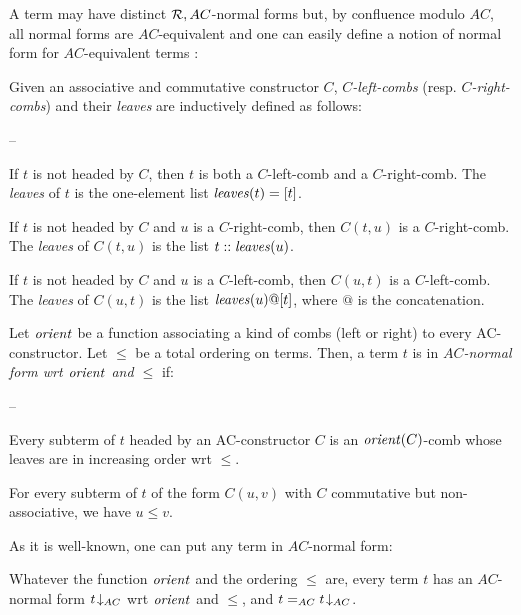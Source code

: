A term may have distinct $\mathcal{R},AC$-normal forms but, by confluence
modulo $AC$, all normal forms are $AC$-equivalent and one can easily
define a notion of normal form for $AC$-equivalent terms
\cite{hullot80thesis}:

\begin{dfn}
Given an associative and commutative constructor $C$, {\em
$C$-left-combs} (resp. {\em $C$-right-combs}) and their {\em leaves}
are inductively defined as follows:

\begin{lst}{--}
\item If $t$ is not headed by $C$, then $t$ is both a $C$-left-comb
and a $C$-right-comb. The {\em leaves} of $t$ is the one-element list
$\mathit{leaves}(t)=[t]$.
\item If $t$ is not headed by $C$ and $u$ is a $C$-right-comb,
then $C(t,u)$ is a $C$-right-comb. The {\em leaves} of $C(t,u)$ is the
list $t::\mathit{leaves}(u)$.
\item If $t$ is not headed by $C$ and $u$ is a $C$-left-comb,
then $C(u,t)$ is a $C$-left-comb. The {\em leaves} of $C(u,t)$ is the
list $\mathit{leaves}(u)@[t]$, where $@$ is the concatenation.
\end{lst}

\noindent
Let $\mathit{orient}$ be a function associating a kind of combs (left or
right) to every AC-constructor. Let $\le$ be a total ordering on
terms. Then, a term $t$ is in {\em $AC$-normal form wrt $\mathit{orient}$ and
$\le$} if:

\begin{lst}{--}
\item Every subterm of $t$ headed by an AC-constructor $C$ is an
$\mathit{orient}(C)$-comb whose leaves are in increasing order wrt $\le$.
\item For every subterm of $t$ of the form $C(u,v)$ with $C$
commutative but non-associative, we have $u\le v$.
\end{lst}
\end{dfn}


As it is well-known, one can put any term in $AC$-normal form:

\begin{thm}
\label{thm-ac}
Whatever the function $\mathit{orient}$ and the ordering $\le$ are, every term
$t$ has an $AC$-normal form $t\!\downarrow_{AC}$ wrt $\mathit{orient}$ and $\le$, and
$t=_{AC}t\!\downarrow_{AC}$.
\end{thm}

